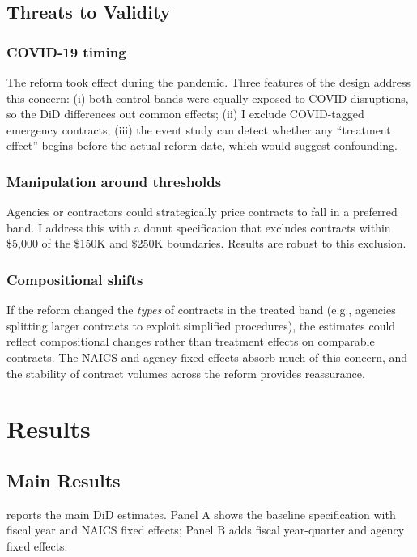 \documentclass[12pt]{article}
\begin{document}
\subsection{Threats to Validity}

\subsubsection*{COVID-19 timing} The reform took effect during the pandemic. Three features of the design address this concern: (i) both control bands were equally exposed to COVID disruptions, so the DiD differences out common effects; (ii) I exclude COVID-tagged emergency contracts; (iii) the event study can detect whether any ``treatment effect'' begins before the actual reform date, which would suggest confounding.

\subsubsection*{Manipulation around thresholds} Agencies or contractors could strategically price contracts to fall in a preferred band. I address this with a donut specification that excludes contracts within \$5,000 of the \$150K and \$250K boundaries. Results are robust to this exclusion.

\subsubsection*{Compositional shifts} If the reform changed the \textit{types} of contracts in the treated band (e.g., agencies splitting larger contracts to exploit simplified procedures), the estimates could reflect compositional changes rather than treatment effects on comparable contracts. The NAICS and agency fixed effects absorb much of this concern, and the stability of contract volumes across the reform provides reassurance.

\section{Results}

\subsection{Main Results}



 reports the main DiD estimates. Panel A shows the baseline specification with fiscal year and NAICS fixed effects; Panel B adds fiscal year-quarter and agency fixed effects.
\end{document}
